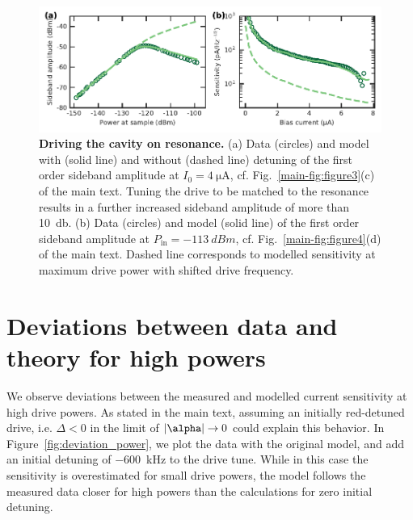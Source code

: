 \begin{figure}
	\centering
	\includegraphics[width=\linewidth]{chapter-currentdetection/figures/SM_Duffing_on_resonance}
	\caption{
		\textbf{Driving the cavity on resonance.}
		(a) Data (circles) and model with (solid line) and without (dashed line) detuning of the first order sideband amplitude at $I_0=\SI{4}{\micro\ampere}$, cf. Fig.~\ref{main-fig:figure3}(c) of the main text.
		Tuning the drive to be matched to the resonance results in a further increased sideband amplitude of more than \SI{10}{\decibel}.
		(b) Data (circles) and model (solid line) of the first order sideband amplitude at $P_\text{in}=\SI{-113}{dBm}$, cf. Fig.~\ref{main-fig:figure4}(d) of the main text.
		Dashed line corresponds to modelled sensitivity at maximum drive power with shifted drive frequency.
	}
	\label{fig:Duffing-on-res}
\end{figure}



\section{Deviations between data and theory for high powers}\label{sec:deviation_power}

We observe deviations between the measured and modelled current sensitivity at high drive powers.
% 
As stated in the main text, assuming an initially red-detuned drive, i.e. $\Delta<0$ in the limit of $\abs{\alpha}\rightarrow 0$ could explain this behavior.
% 
In Figure~\ref{fig:deviation_power}, we plot the data with the original model, and add an initial detuning of \SI{-600}{\kilo\hertz} to the drive tune.
% 
While in this case the sensitivity is overestimated for small drive powers, the model follows the measured data closer for high powers than the calculations for zero initial detuning.

